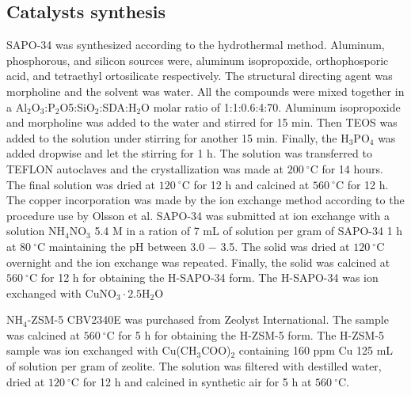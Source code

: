 \documentclass[preprint,12pt]{elsarticle}
\newcommand{\degreeC}[1]{$#1\  ^{\circ}\mathrm{C}$}
\begin{document}
\subsection{Catalysts synthesis}
SAPO-34 was synthesized according to the hydrothermal method. Aluminum, phosphorous, and silicon sources were, aluminum isopropoxide, orthophosporic acid, and tetraethyl ortosilicate respectively. The structural directing agent was morpholine and the solvent was water. All the compounds were mixed together in a Al$_2$O$_3$:P$_2$O5:SiO$_2$:SDA:H$_2$O molar ratio of 1:1:0.6:4:70. Aluminum isopropoxide and morpholine was added to the water and stirred for 15 min. Then TEOS was added to the solution under stirring for another 15 min. Finally, the H$_3$PO$_4$ was added dropwise and let the stirring for 1 h. The solution was transferred to TEFLON autoclaves and the crystallization was made at \degreeC{200} for 14 hours. The final solution was dried at \degreeC{120} for 12 h and calcined at \degreeC{560} for 12 h. The copper incorporation was made by the ion exchange method according to the procedure use by Olsson et al. SAPO-34 was submitted at ion exchange with a solution NH$_4$NO$_3$ 5.4 M in a ration of 7 mL of solution per gram of SAPO-34 1 h at \degreeC{80} maintaining the pH between 3.0 $-$ 3.5. The solid was dried at \degreeC{120} overnight and the ion exchange was repeated. Finally, the solid was calcined at \degreeC{560} for 12 h for obtaining the H-SAPO-34 form. The H-SAPO-34 was ion exchanged with $\mathrm{CuNO_3\cdot2.5H_2O}$

NH$_4$-ZSM-5 CBV2340E was purchased from Zeolyst International. The sample was calcined at \degreeC{560} for 5 h for obtaining the H-ZSM-5 form. The H-ZSM-5 sample was ion exchanged with Cu(CH$_3$COO)$_2$ containing 160 ppm Cu 125 mL of solution per gram of zeolite. The solution was filtered with destilled water, dried at \degreeC{120} for 12 h and calcined in synthetic air for 5 h at \degreeC{560}.


\end{document}
